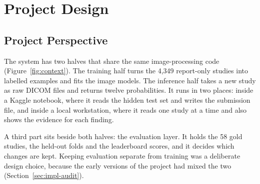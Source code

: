 \chapter[PROJECT DESIGN]{Project Design}
\label{ch:design}

\section{Project Perspective}

The system has two halves that share the same image-processing code (Figure~\ref{fig:context}). The training half turns the 4,349 report-only studies into labelled examples and fits the image models. The inference half takes a new study as raw DICOM files and returns twelve probabilities. It runs in two places: inside a Kaggle notebook, where it reads the hidden test set and writes the submission file, and inside a local workstation, where it reads one study at a time and also shows the evidence for each finding.

A third part sits beside both halves: the evaluation layer. It holds the 58 gold studies, the held-out folds and the leaderboard scores, and it decides which changes are kept. Keeping evaluation separate from training was a deliberate design choice, because the early versions of the project had mixed the two (Section~\ref{sec:impl-audit}).

